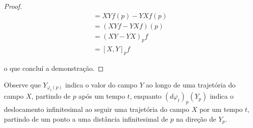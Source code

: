 \begin{proposition}
\begin{proof}
\begin{align*}
                                                                                    & = XYf(p) - YXf(p)                                                                                      \\
                                                                                    & = (XYf - YXf)(p)                                                                                       \\
                                                                                    & = (XY-YX)_{p}f                                                                                         \\
                                                                                    & =[X,Y]_{p}f
        \end{align*}

        o que concluí a demonstração.
    \end{proof}
\end{proposition}
Observe que $Y_{\varphi_t(p)}$ indica o valor do campo $Y$ ao longo de uma trajetória do campo $X$, partindo de $p$ após um tempo $t$, enquanto $(d\varphi_t)_p(Y_{p})$ indica o deslocamento infinitesimal ao seguir uma
trajetória do campo $X$ por um tempo $t$, partindo de um ponto a uma distância infinitesimal de
$p$ na direção de $Y_p$.

